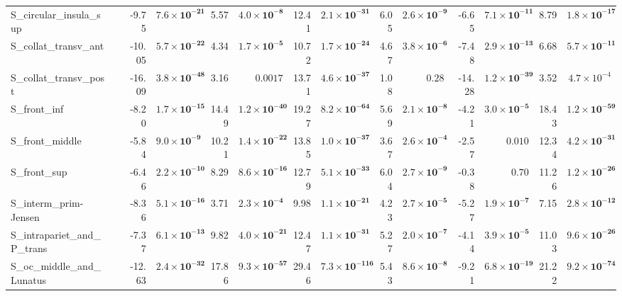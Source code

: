 {\begin{longtable}{llrrrrrrrrrrrr}
S\_circular\_insula\_sup &  & -9.75 & $\mathbf{7.6{\times}10^{-21}}$ & 5.57 & $\mathbf{4.0{\times}10^{-8}}$ & 12.41 & $\mathbf{2.1{\times}10^{-31}}$ & 6.05 & $\mathbf{2.6{\times}10^{-9}}$ & -6.65 & $\mathbf{7.1{\times}10^{-11}}$ & 8.79 & $\mathbf{1.8{\times}10^{-17}}$ \\
S\_collat\_transv\_ant &  & -10.05 & $\mathbf{5.7{\times}10^{-22}}$ & 4.34 & $\mathbf{1.7{\times}10^{-5}}$ & 10.72 & $\mathbf{1.7{\times}10^{-24}}$ & 4.67 & $\mathbf{3.8{\times}10^{-6}}$ & -7.48 & $\mathbf{2.9{\times}10^{-13}}$ & 6.68 & $\mathbf{5.7{\times}10^{-11}}$ \\
S\_collat\_transv\_post &  & -16.09 & $\mathbf{3.8{\times}10^{-48}}$ & 3.16 & $0.0017$ & 13.71 & $\mathbf{4.6{\times}10^{-37}}$ & 1.08 & $0.28$ & -14.28 & $\mathbf{1.2{\times}10^{-39}}$ & 3.52 & $4.7{\times}10^{-4}$ \\
S\_front\_inf &  & -8.20 & $\mathbf{1.7{\times}10^{-15}}$ & 14.49 & $\mathbf{1.2{\times}10^{-40}}$ & 19.27 & $\mathbf{8.2{\times}10^{-64}}$ & 5.69 & $\mathbf{2.1{\times}10^{-8}}$ & -4.21 & $\mathbf{3.0{\times}10^{-5}}$ & 18.43 & $\mathbf{1.2{\times}10^{-59}}$ \\
S\_front\_middle &  & -5.84 & $\mathbf{9.0{\times}10^{-9}}$ & 10.21 & $\mathbf{1.4{\times}10^{-22}}$ & 13.85 & $\mathbf{1.0{\times}10^{-37}}$ & 3.67 & $\mathbf{2.6{\times}10^{-4}}$ & -2.57 & $0.010$ & 12.34 & $\mathbf{4.2{\times}10^{-31}}$ \\
S\_front\_sup &  & -6.46 & $\mathbf{2.2{\times}10^{-10}}$ & 8.29 & $\mathbf{8.6{\times}10^{-16}}$ & 12.79 & $\mathbf{5.1{\times}10^{-33}}$ & 6.04 & $\mathbf{2.7{\times}10^{-9}}$ & -0.38 & $0.70$ & 11.26 & $\mathbf{1.2{\times}10^{-26}}$ \\
S\_interm\_prim-Jensen &  & -8.36 & $\mathbf{5.1{\times}10^{-16}}$ & 3.71 & $\mathbf{2.3{\times}10^{-4}}$ & 9.98 & $\mathbf{1.1{\times}10^{-21}}$ & 4.23 & $\mathbf{2.7{\times}10^{-5}}$ & -5.27 & $\mathbf{1.9{\times}10^{-7}}$ & 7.15 & $\mathbf{2.8{\times}10^{-12}}$ \\
S\_intrapariet\_and\_P\_trans &  & -7.37 & $\mathbf{6.1{\times}10^{-13}}$ & 9.82 & $\mathbf{4.0{\times}10^{-21}}$ & 12.47 & $\mathbf{1.1{\times}10^{-31}}$ & 5.27 & $\mathbf{2.0{\times}10^{-7}}$ & -4.14 & $\mathbf{3.9{\times}10^{-5}}$ & 11.03 & $\mathbf{9.6{\times}10^{-26}}$ \\
S\_oc\_middle\_and\_Lunatus &  & -12.63 & $\mathbf{2.4{\times}10^{-32}}$ & 17.86 & $\mathbf{9.3{\times}10^{-57}}$ & 29.46 & $\mathbf{7.3{\times}10^{-116}}$ & 5.43 & $\mathbf{8.6{\times}10^{-8}}$ & -9.21 & $\mathbf{6.8{\times}10^{-19}}$ & 21.22 & $\mathbf{9.2{\times}10^{-74}}$ \\

\end{longtable}}
